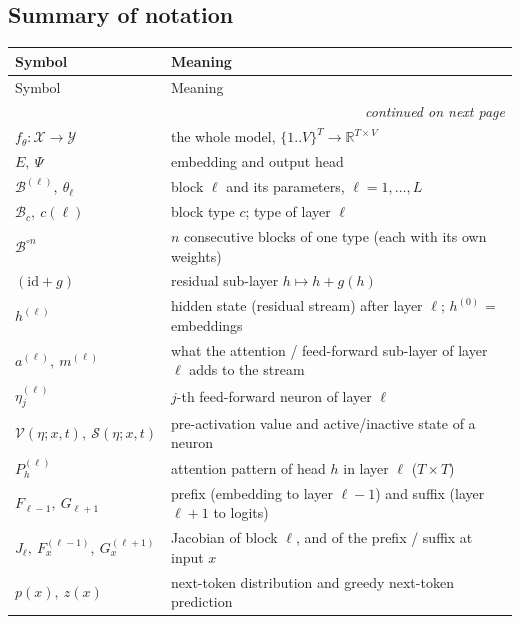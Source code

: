 \documentclass[10pt,a4paper]{article}
\theoremstyle{definition}
\begin{document}
\subsection{Summary of notation}
\begin{longtable}{l>{\raggedright\arraybackslash}p{10.5cm}}
\toprule
Symbol & Meaning \\
\midrule
\endfirsthead
\toprule
Symbol & Meaning \\
\midrule
\endhead
\midrule \multicolumn{2}{r}{\textit{continued on next page}} \\
\endfoot
\bottomrule
\endlastfoot
$f_\theta:\mathcal{X}\to\mathcal{Y}$ & the whole model, $\{1..V\}^T\to\mathbb{R}^{T\times V}$ \\
$E,\ \Psi$ & embedding and output head \\
$\mathcal{B}^{(\ell)},\ \theta_\ell$ & block $\ell$ and its parameters, $\ell=1,\dots,L$ \\
$\mathcal{B}_c,\ c(\ell)$ & block type $c$; type of layer $\ell$ \\
$\mathcal{B}^{\circ n}$ & $n$ consecutive blocks of one type (each with its own weights) \\
$(\mathrm{id}+g)$ & residual sub-layer $h\mapsto h+g(h)$ \\
$h^{(\ell)}$ & hidden state (residual stream) after layer $\ell$; $h^{(0)}$ = embeddings \\
$a^{(\ell)},\ m^{(\ell)}$ & what the attention / feed-forward sub-layer of layer $\ell$ adds to the stream \\
$\eta^{(\ell)}_j$ & $j$-th feed-forward neuron of layer $\ell$ \\
$\mathcal{V}(\eta;x,t),\ \mathcal{S}(\eta;x,t)$ & pre-activation value and active/inactive state of a neuron \\
$P^{(\ell)}_h$ & attention pattern of head $h$ in layer $\ell$ ($T\times T$) \\
$F_{\ell-1},\ G_{\ell+1}$ & prefix (embedding to layer $\ell-1$) and suffix (layer $\ell+1$ to logits) \\
$J_\ell,\ F^{(\ell-1)}_x,\ G^{(\ell+1)}_x$ & Jacobian of block $\ell$, and of the prefix / suffix at input $x$ \\
$p(x),\ z(x)$ & next-token distribution and greedy next-token prediction \\
\end{longtable}
\end{document}
